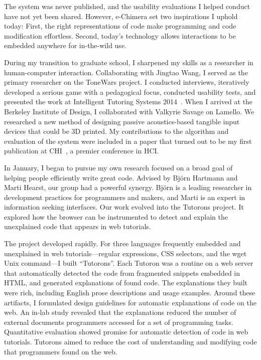 \documentclass[12pt]{memoir}
\begin{document}
The system was never published, and the usability evaluations I helped conduct have not yet been shared.
However, e-Chimera set two inspirations I uphold today:
First, the right representations of code make programming and code modification effortless.
Second, today's technology allows interactions to be embedded anywhere for in-the-wild use.

During my transition to graduate school, I sharpened my skills as a researcher in human-computer interaction.
Collaborating with Jingtao Wang, I served as the primary researcher on the ToneWars project.
I conducted interviews, iteratively developed a serious game with a pedagogical focus, conducted usability tests, and presented the work at Intelligent Tutoring Systems 2014~\cite{head_tonewars_2014}.
When I arrived at the Berkeley Institute of Design, I collaborated with Valkyrie Savage on Lamello.
We researched a new method of designing passive acoustics-based tangible input devices that could be 3D printed.
My contributions to the algorithm and evaluation of the system were included in a paper that turned out to be my first publication at CHI~\cite{savage_lamello_2015}, a premier conference in HCI\@.

In January, I began to pursue my own research focused on a broad goal of helping people efficiently write great code.
Advised by Bj\"{o}rn Hartmann and Marti Hearst, our group had a powerful synergy.
Bj\"{o}rn is a leading researcher in development practices for programmers and makers, and Marti is an expert in information seeking interfaces.
Our work evolved into the Tutorons project.
It explored how the browser can be instrumented to detect and explain the unexplained code that appears in web tutorials.%

The project developed rapidly.
For three languages frequently embedded and unexplained in web tutorials---regular expressions, CSS selectors, and the wget Unix command---I built ``Tutorons''.
Each Tutoron was a routine on a web server that automatically detected the code from fragmented snippets embedded in HTML, and generated explanations of found code.
The explanations they built were rich, including English prose descriptions and usage examples.
Around these artifacts, I formulated design guidelines for automatic explanations of code on the web.
An in-lab study revealed that the explanations reduced the number of external documents programmers accessed for a set of programming tasks.
Quantitative evaluation showed promise for automatic detection of code in web tutorials.
Tutorons aimed to reduce the cost of understanding and modifying code that programmers found on the web.
\end{document}

